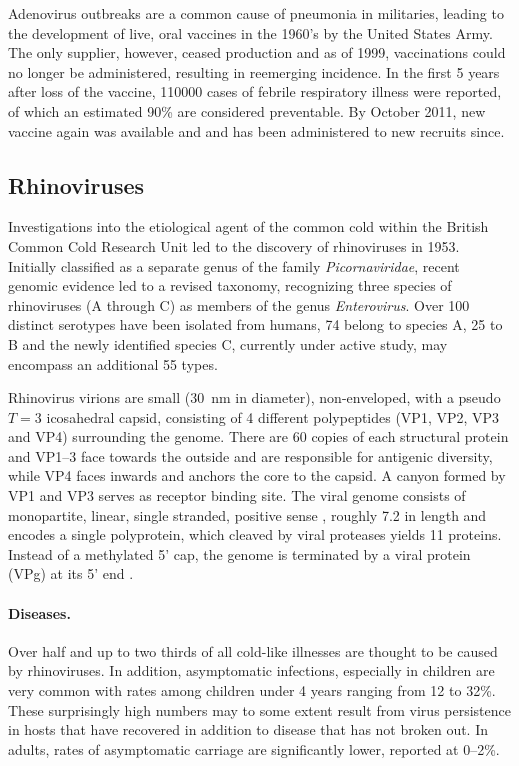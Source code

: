 Adenovirus outbreaks are a common cause of pneumonia in militaries, leading to the development of live, oral vaccines in the 1960's by the United States Army. The only supplier, however, ceased production and as of 1999, vaccinations could no longer be administered, resulting in reemerging incidence. In the first 5 years after loss of the vaccine, 110000 cases of febrile respiratory illness were reported, of which an estimated 90\% are considered preventable. By October 2011, new vaccine again was available and and has been administered to new recruits since.

\subsection{Rhinoviruses}
Investigations into the etiological agent of the common cold within the British Common Cold Research Unit led to the discovery of rhinoviruses in 1953. Initially classified as a separate genus of the family \textit{Picornaviridae}, recent genomic evidence led to a revised taxonomy, recognizing three species of rhinoviruses (A through C) as members of the genus \textit{Enterovirus}. Over 100 distinct serotypes have been isolated from humans, 74 belong to species A, 25 to B and the newly identified species C, currently under active study, may encompass an additional 55 types.

Rhinovirus virions are small (\SI{30}{\nano\meter} in diameter), non-enveloped, with a pseudo $T=3$ icosahedral capsid, consisting of 4 different polypeptides (VP1, VP2, VP3 and VP4) surrounding the  genome. There are 60 copies of each structural protein and VP1--3 face towards the outside and are responsible for antigenic diversity, while VP4 faces inwards and anchors the  core to the capsid. A canyon formed by VP1 and VP3 serves as receptor binding site. The viral genome consists of monopartite, linear, single stranded, positive sense , roughly \SI{7.2}{\kilobase} in length and encodes a single polyprotein, which cleaved by viral proteases yields 11 proteins. Instead of a methylated 5' cap, the  genome is terminated by a viral protein (VPg) at its 5' end \citep{Jacobs2013}.

\paragraph{Diseases.}
Over half and up to two thirds of all cold-like illnesses are thought to be caused by rhinoviruses. In addition, asymptomatic infections, especially in children are very common with rates among children under 4 years ranging from 12 to 32\%. These surprisingly high numbers may to some extent result from virus persistence in hosts that have recovered in addition to disease that has not broken out. In adults, rates of asymptomatic carriage are significantly lower, reported at 0--2\%.

